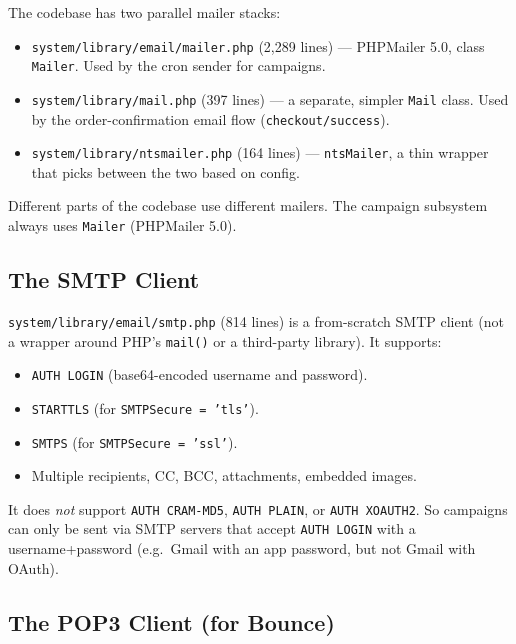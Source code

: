 \documentclass[11pt,a4paper]{article}
\begin{document}
\begin{findingbox}
The codebase has two parallel mailer stacks:

\begin{itemize}[leftmargin=1.6em,itemsep=2pt]
  \item \texttt{system/library/email/mailer.php} (2,289 lines) ---
        PHPMailer 5.0, class \texttt{Mailer}. Used by the cron
        sender for campaigns.
  \item \texttt{system/library/mail.php} (397 lines) --- a
        separate, simpler \texttt{Mail} class. Used by the
        order-confirmation email flow (\texttt{checkout/success}).
  \item \texttt{system/library/ntsmailer.php} (164 lines) ---
        \texttt{ntsMailer}, a thin wrapper that picks between the
        two based on config.
\end{itemize}

Different parts of the codebase use different mailers. The
campaign subsystem always uses \texttt{Mailer} (PHPMailer 5.0).
\end{findingbox}

\subsection{The SMTP Client}

\texttt{system/library/email/smtp.php} (814 lines) is a
from-scratch SMTP client (not a wrapper around PHP's
\texttt{mail()} or a third-party library). It supports:

\begin{itemize}[leftmargin=1.6em,itemsep=2pt]
  \item \texttt{AUTH LOGIN} (base64-encoded username and password).
  \item \texttt{STARTTLS} (for \texttt{SMTPSecure = 'tls'}).
  \item \texttt{SMTPS} (for \texttt{SMTPSecure = 'ssl'}).
  \item Multiple recipients, CC, BCC, attachments, embedded
        images.
\end{itemize}

It does \emph{not} support \texttt{AUTH CRAM-MD5},
\texttt{AUTH PLAIN}, or \texttt{AUTH XOAUTH2}. So campaigns can
only be sent via SMTP servers that accept \texttt{AUTH LOGIN}
with a username+password (e.g.\ Gmail with an app password, but
not Gmail with OAuth).

\subsection{The POP3 Client (for Bounce)}
\end{document}
